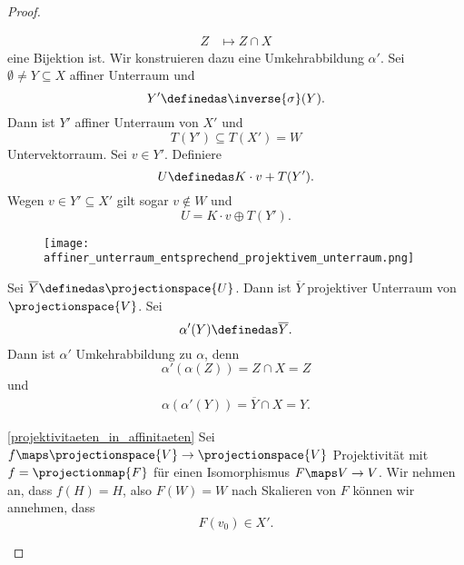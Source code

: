 \begin{proof}
\begin{proofdescription}
\begin{equation*}
\begin{split}
      Z&\mapsto Z\cap X
      \end{split}
    \end{equation*}
    eine Bijektion ist. Wir konstruieren dazu eine Umkehrabbildung \( \alpha' \). Sei \( \emptyset \neq Y\subseteq X \) affiner Unterraum und
    \begin{equation*}
      Y'\definedas \inverse{\sigma}(Y).
    \end{equation*}
    Dann ist \( Y' \) affiner Unterraum von \( X' \) und
    \begin{equation*}
      T(Y')\subseteq  T(X')=W
    \end{equation*}
    Untervektorraum. Sei \( v\in Y' \). Definiere
    \begin{equation*}
      U\definedas K\cdot v+T(Y').
    \end{equation*}
    Wegen \( v\in Y'\subseteq X' \) gilt sogar \( v\not\in W \) und
    \begin{equation*}
      U=K\cdot v\oplus T(Y').
    \end{equation*}
    \begin{figure}[H]
      \centering
      \texttt{[image: affiner\_unterraum\_entsprechend\_projektivem\_unterraum.png]}
      \label{fig:affiner_unterraum_entsprechend_projektivem_unterraum.png}
    \end{figure}
    Sei \( \overline{Y}\definedas \projectionspace{U} \). Dann ist \( \overline{Y} \) projektiver Unterraum von \( \projectionspace{V} \). Sei
    \begin{equation*}
      \alpha'(Y)\definedas \overline{Y}.
    \end{equation*}
    Dann ist \( \alpha' \) Umkehrabbildung zu \( \alpha \), denn
    \begin{equation*}
      \alpha'(\alpha(Z))=Z\cap X=Z
    \end{equation*}
    und
    \begin{align*}
      \alpha(\alpha'(Y))=\overline{Y}\cap X=Y.
    \end{align*}
    \item[\ref{projektivitaeten_in_affinitaeten}] Sei \( f\maps \projectionspace{V}\to \projectionspace{V} \) Projektivität mit \( f=\projectionmap{F} \) für einen Isomorphismus \( F\maps V\to V \). Wir nehmen an, dass \( f(H)=H \), also \( F(W)=W \) nach Skalieren von \( F \) können wir annehmen, dass 
    \begin{equation*}
      F(v_0)\in X'.
    \end{equation*}
    \begin{figure}[H]

\end{figure}
\end{proofdescription}
\end{proof}
